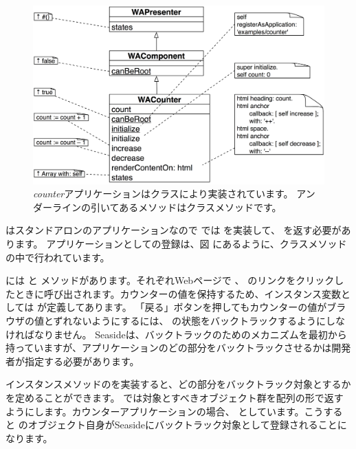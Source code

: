 \documentclass[a4paper,10pt,twoside]{book}
\begin{document}
{{\begin{figure}[ht]
\begin{center}
\includegraphics[width=\textwidth]{WACounter}
\caption{\emph{counter}アプリケーションはクラスにより実装されています。  アンダーラインの引いてあるメソッドはクラスメソッドです。}
\end{center}
\end{figure}

  はスタンドアロンのアプリケーションなので  では   を実装して、 を返す必要があります。
 アプリケーションとしての登録は、図 にあるように、クラスメソッド の中で行われています。 

 には  と メソッドがあります。それぞれWebページで \link{++} 、 \link{--\,--} のリンクをクリックしたときに呼び出されます。カウンターの値を保持するため、インスタンス変数としては が定義してあります。
「戻る」ボタンを押してもカウンターの値がブラウザの値とずれないようにするには、 の状態をバックトラックするようにしなければなりません。
Seasideは、バックトラックのためのメカニズムを最初から持っていますが、アプリケーションのどの部分をバックトラックさせるかは開発者が指定する必要があります。

インスタンスメソッドのを実装すると、どの部分をバックトラック対象とするかを定めることができます。
 では対象とすべきオブジェクト群を配列の形で返すようにします。カウンターアプリケーションの場合、 としています。こうすると  のオブジェクト自身がSeasideにバックトラック対象として登録されることになります。

}}
\end{document}
